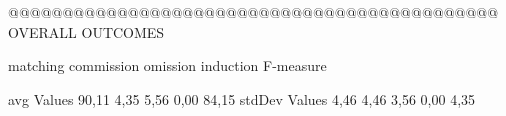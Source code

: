  @@@@@@@@@@@@@@@@@@@@@@@@@@@@@@@@@@@@@@@@@@@@@ OVERALL OUTCOMES

                matching commission   omission  induction   F-measure

avg Values      90,11       4,35       5,56       0,00       84,15        
stdDev Values    4,46       4,46       3,56       0,00        4,35        
